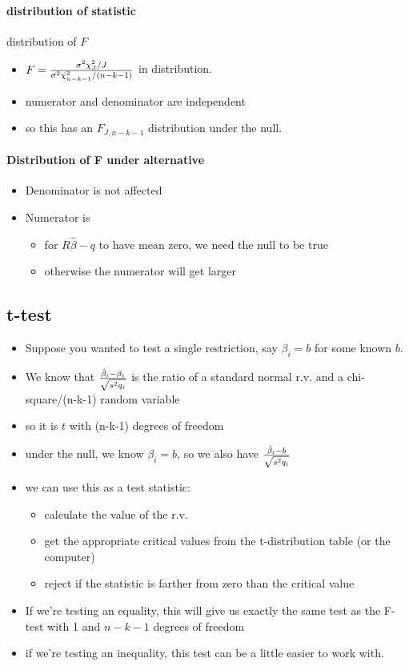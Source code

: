 \paragraph{distribution of statistic}
\label{sec-2-2-2-3}

       distribution of $F$
\begin{itemize}
\item $F = {\sigma^2 \chi_J^2 / J \over \sigma^2 \chi_{n-k-1}^2 /
         (n-k-1)}$ in distribution.
\item numerator and denominator are independent
\item so this has an $F_{J, n-k-1}$ distribution under the null.
\end{itemize}
\paragraph{Distribution of F under alternative}
\label{sec-2-2-3}

\begin{itemize}
\item Denominator is not affected
\item Numerator is
\begin{itemize}
\item for $R\hat\beta - q$ to have mean zero, we need the null to
          be true
\item otherwise the numerator will get larger
\end{itemize}
\end{itemize}
\subsection{t-test}
\label{sec-2-3}

\begin{itemize}
\item Suppose you wanted to test a single restriction, say $\beta_i =
       b$ for some known $b$.
\item We know that ${\hat\beta_i - \beta_i \over \sqrt{s^2 q_i}}$ is
       the ratio of a standard normal r.v. and a chi-square/(n-k-1)
       random variable
\item so it is $t$ with (n-k-1) degrees of freedom
\item under the null, we know $\beta_i = b$, so we also have
       ${\hat\beta_i - b \over \sqrt{s^2 q_i}}$
\item we can use this as a test statistic:
\begin{itemize}
\item calculate the value of the r.v.
\item get the appropriate critical values from the t-distribution
         table (or the computer)
\item reject if the statistic is farther from zero than the
         critical value
\end{itemize}
\item If we're testing an equality, this will give us exactly the
       same test as the F-test with 1 and $n-k-1$ degrees of freedom
\item if we're testing an inequality, this test can be a little
       easier to work with.
\end{itemize}
